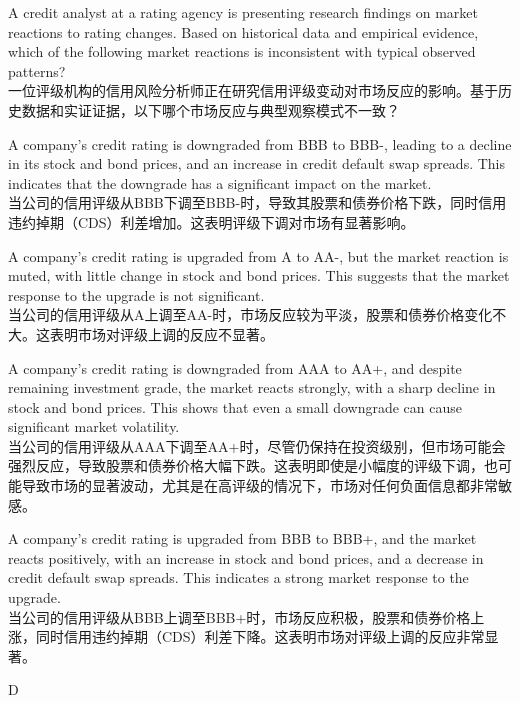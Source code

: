 \documentclass{article}
\newcounter{question} %
\begin{document}
\begin{question}
    A credit analyst at a rating agency is presenting research findings on market reactions to rating changes. Based on historical data and empirical evidence, which of the following market reactions is inconsistent with typical observed patterns?
    \\一位评级机构的信用风险分析师正在研究信用评级变动对市场反应的影响。基于历史数据和实证证据，以下哪个市场反应与典型观察模式不一致？
\end{question}
\begin{choices}
    \item A company's credit rating is downgraded from BBB to BBB-, leading to a decline in its stock and bond prices, and an increase in credit default swap spreads. This indicates that the downgrade has a significant impact on the market.
    \\当公司的信用评级从BBB下调至BBB-时，导致其股票和债券价格下跌，同时信用违约掉期（CDS）利差增加。这表明评级下调对市场有显著影响。
    \item A company's credit rating is upgraded from A to AA-, but the market reaction is muted, with little change in stock and bond prices. This suggests that the market response to the upgrade is not significant.
    \\当公司的信用评级从A上调至AA-时，市场反应较为平淡，股票和债券价格变化不大。这表明市场对评级上调的反应不显著。
    \item A company's credit rating is downgraded from AAA to AA+, and despite remaining investment grade, the market reacts strongly, with a sharp decline in stock and bond prices. This shows that even a small downgrade can cause significant market volatility.
    \\当公司的信用评级从AAA下调至AA+时，尽管仍保持在投资级别，但市场可能会强烈反应，导致股票和债券价格大幅下跌。这表明即使是小幅度的评级下调，也可能导致市场的显著波动，尤其是在高评级的情况下，市场对任何负面信息都非常敏感。
    \item A company's credit rating is upgraded from BBB to BBB+, and the market reacts positively, with an increase in stock and bond prices, and a decrease in credit default swap spreads. This indicates a strong market response to the upgrade.
    \\当公司的信用评级从BBB上调至BBB+时，市场反应积极，股票和债券价格上涨，同时信用违约掉期（CDS）利差下降。这表明市场对评级上调的反应非常显著。
\end{choices}

\begin{correctanswer}
    D
\end{correctanswer}
\end{document}
